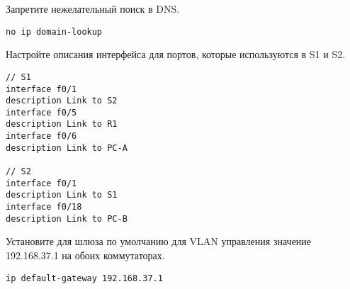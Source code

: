 Запретите нежелательный поиск в DNS.

\begin{verbatim}
no ip domain-lookup
\end{verbatim}

Настройте описания интерфейса для портов, которые используются в S1 и S2.

\begin{verbatim}
// S1
interface f0/1
description Link to S2
interface f0/5
description Link to R1
interface f0/6
description Link to PC-A

// S2
interface f0/1
description Link to S1
interface f0/18
description Link to PC-B
\end{verbatim}

Установите для шлюза по умолчанию для VLAN управления значение 192.168.37.1
на обоих коммутаторах.

\begin{verbatim}
ip default-gateway 192.168.37.1
\end{verbatim}

